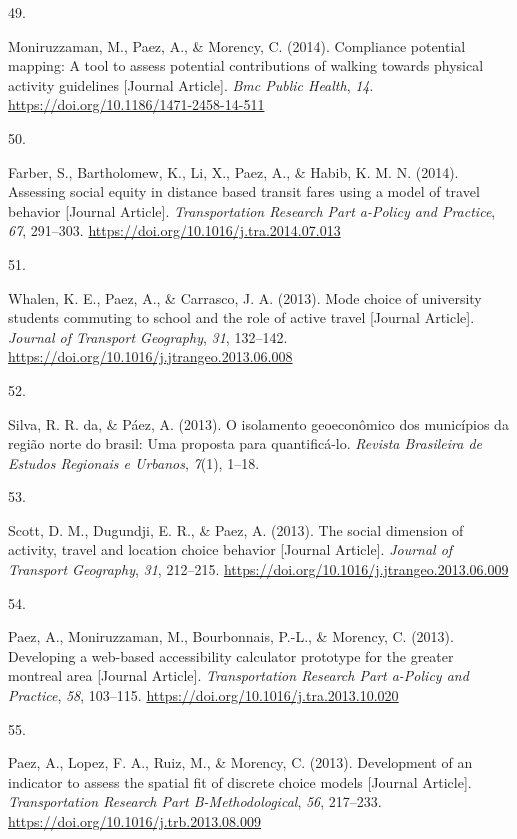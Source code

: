\documentclass[11pt,a4paper,]{awesome-cv}
\newlength{\csllabelwidth}
\newcommand{\CSLLeftMargin}[1]{\parbox[t]{\csllabelwidth}{#1}}
\newcommand{\CSLRightInline}[1]{\parbox[t]{\linewidth - \csllabelwidth}{#1}}
\begin{document}
\leavevmode{}%
\CSLLeftMargin{49. }
\CSLRightInline{Moniruzzaman, M., Paez, A., \& Morency, C. (2014).
Compliance potential mapping: A tool to assess potential contributions
of walking towards physical activity guidelines {[}Journal Article{]}.
\emph{Bmc Public Health}, \emph{14}.
\url{https://doi.org/10.1186/1471-2458-14-511}}

\leavevmode{}%
\CSLLeftMargin{50. }
\CSLRightInline{Farber, S., Bartholomew, K., Li, X., Paez, A., \& Habib,
K. M. N. (2014). Assessing social equity in distance based transit fares
using a model of travel behavior {[}Journal Article{]}.
\emph{Transportation Research Part a-Policy and Practice}, \emph{67},
291--303. \url{https://doi.org/10.1016/j.tra.2014.07.013}}

\leavevmode{}%
\CSLLeftMargin{51. }
\CSLRightInline{Whalen, K. E., Paez, A., \& Carrasco, J. A. (2013). Mode
choice of university students commuting to school and the role of active
travel {[}Journal Article{]}. \emph{Journal of Transport Geography},
\emph{31}, 132--142.
\url{https://doi.org/10.1016/j.jtrangeo.2013.06.008}}

\leavevmode{}%
\CSLLeftMargin{52. }
\CSLRightInline{Silva, R. R. da, \& Páez, A. (2013). O isolamento
geoeconômico dos municípios da região norte do brasil: Uma proposta para
quantificá-lo. \emph{Revista Brasileira de Estudos Regionais e Urbanos},
\emph{7}(1), 1--18.}

\leavevmode{}%
\CSLLeftMargin{53. }
\CSLRightInline{Scott, D. M., Dugundji, E. R., \& Paez, A. (2013). The
social dimension of activity, travel and location choice behavior
{[}Journal Article{]}. \emph{Journal of Transport Geography}, \emph{31},
212--215. \url{https://doi.org/10.1016/j.jtrangeo.2013.06.009}}

\leavevmode{}%
\CSLLeftMargin{54. }
\CSLRightInline{Paez, A., Moniruzzaman, M., Bourbonnais, P.-L., \&
Morency, C. (2013). Developing a web-based accessibility calculator
prototype for the greater montreal area {[}Journal Article{]}.
\emph{Transportation Research Part a-Policy and Practice}, \emph{58},
103--115. \url{https://doi.org/10.1016/j.tra.2013.10.020}}

\leavevmode{}%
\CSLLeftMargin{55. }
\CSLRightInline{Paez, A., Lopez, F. A., Ruiz, M., \& Morency, C. (2013).
Development of an indicator to assess the spatial fit of discrete choice
models {[}Journal Article{]}. \emph{Transportation Research Part
B-Methodological}, \emph{56}, 217--233.
\url{https://doi.org/10.1016/j.trb.2013.08.009}}
\end{document}
